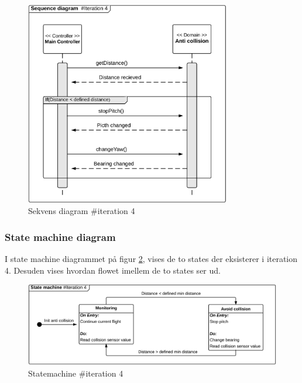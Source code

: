 \begin{figure}[H]
	\centering
	\includegraphics[width=0.8\textwidth]{Billeder/sekvens/sekvens_iteration4}
	\caption{Sekvens diagram \#iteration 4}
	\label{fig:Sekvens_diagram_iteration4}
\end{figure}



\subsubsection*{State machine diagram}
\vspace{-0.2cm}

I state machine diagrammet på figur \ref{fig:Statemachine_iteration4}, vises de to states der eksisterer i iteration 4. Desuden vises hvordan flowet imellem de to states ser ud.


\begin{figure}[H]
	\centering
	\includegraphics[width=1\textwidth]{Billeder/statemachine/State_iteration4.png}
	\vspace{-0.5cm}
	\caption{Statemachine \#iteration 4}
	\label{fig:Statemachine_iteration4}
\end{figure}



